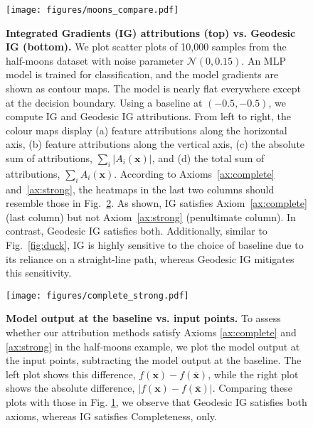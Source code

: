 \begin{figure}[!t]
	\vskip -0.1in
	\begin{center}
		\centerline{\texttt{[image: figures/moons\_compare.pdf]}}
		\vskip -0.2in
		\caption{\textbf{Integrated Gradients (IG) attributions (top) vs. Geodesic IG (bottom).} 
			We plot scatter plots of 10,000 samples from the half-moons dataset with noise parameter $\mathcal{N}(0, 0.15)$. An MLP model is trained for classification, and the model gradients are shown as contour maps. The model is nearly flat everywhere except at the decision boundary.  
			Using a baseline at $(-0.5, -0.5)$, we compute IG and Geodesic IG attributions. From left to right, the colour maps display (a) feature attributions along the horizontal axis, (b) feature attributions along the vertical axis, (c) the absolute sum of attributions, $\sum_i |A_i(\mathbf{x})|$, and (d) the total sum of attributions, $\sum_i A_i(\mathbf{x})$.  
			According to Axioms~\ref{ax:complete} and~\ref{ax:strong}, the heatmaps in the last two columns should resemble those in Fig.~\ref{fig:outcome_diff}. As shown, IG satisfies Axiom~\ref{ax:complete} (last column) but not Axiom~\ref{ax:strong} (penultimate column). In contrast, Geodesic IG satisfies both. Additionally, similar to Fig.~\ref{fig:duck}, IG is highly sensitive to the choice of baseline due to its reliance on a straight-line path, whereas Geodesic IG mitigates this sensitivity.}  
		
		\label{fig:ig}
	\end{center}
	\vskip -0.2in
\end{figure}

\begin{figure}[!b]
	\vskip -0.1in
	\begin{center}
		\centerline{\texttt{[image: figures/complete\_strong.pdf]}}
		\vskip -0.2in
		\caption{\textbf{Model output at the baseline vs. input points.} To assess whether our attribution methods satisfy Axioms \ref{ax:complete} and \ref{ax:strong} in the half-moons example, we plot the model output at the input points, subtracting the model output at the baseline. The left plot shows this difference, $f(\textbf{x}) - f(\overline{\textbf{x}})$, while the right plot shows the absolute difference, $|f(\textbf{x}) - f(\overline{\textbf{x}})|$. Comparing these plots with those in Fig. \ref{fig:ig}, we observe that Geodesic IG satisfies both axioms, whereas IG satisfies Completeness, only.}
		\label{fig:outcome_diff}
	\end{center}
	\vskip -0.2in
\end{figure}

